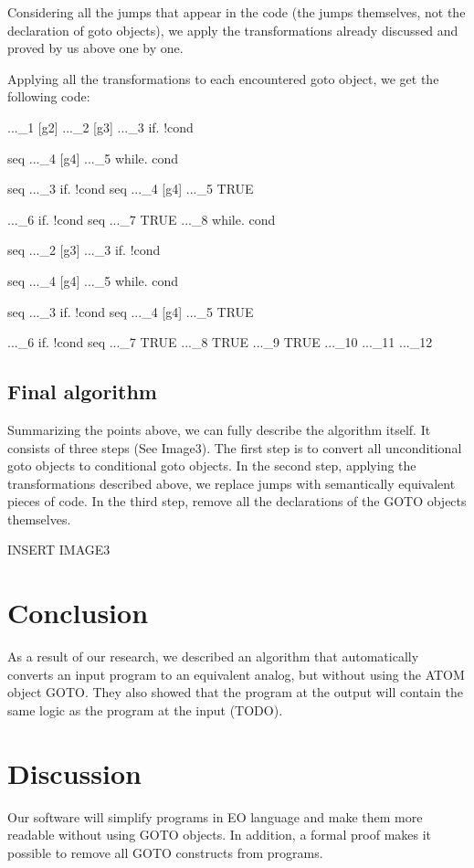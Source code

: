 \documentclass[sigplan,review,11pt,nonacm,natbib=false]{acmart}
\begin{document}
Considering all the jumps that appear in the code (the jumps themselves, not the declaration of goto objects), we apply the transformations already discussed and proved by us above one by one.

Applying all the transformations to each encountered goto object, we get the following code:
\begin{ffcode}
[g1]
 ..._1
 [g2]
  ..._2
  [g3]
   ..._3
   if.
    !cond
    
    seq
     ..._4
     [g4]
      ..._5
      while.
       cond
       
       seq
        ..._3
        if.
         !cond
         seq
          ..._4
          [g4]
           ..._5
         TRUE
       
      ..._6
      if.
       !cond
       seq
        ..._7
       TRUE
     ..._8
     while.
      cond
      
      seq
       ..._2
       [g3]
       ..._3
       if.
        !cond
         
        seq
         ..._4
         [g4]
          ..._5
          while.
           cond
                 
           seq
            ..._3
            if.
             !cond
             seq
              ..._4
              [g4]
               ..._5
             TRUE
                  
          ..._6
          if.
           !cond
           seq
            ..._7
           TRUE
         ..._8
        TRUE
     ..._9
    TRUE    
   ..._10 
 ..._11
..._12
\end{ffcode}

\subsection{Final algorithm}
Summarizing the points above, we can fully describe the algorithm itself. It consists of three steps (See Image3). The first step is to convert all unconditional goto objects to conditional goto objects. In the second step, applying the transformations described above, we replace jumps with semantically equivalent pieces of code. In the third step, remove all the declarations of the GOTO objects themselves.

{INSERT IMAGE3}

\section{Conclusion}
As a result of our research, we described an algorithm that automatically converts an input program to an equivalent analog, but without using the ATOM object GOTO. They also showed that the program at the output will contain the same logic as the program at the input (TODO).

\section{Discussion}
Our software will simplify programs in EO language and make them more readable without using GOTO objects. In addition, a formal proof makes it possible to remove all GOTO constructs from programs.
\end{document}
